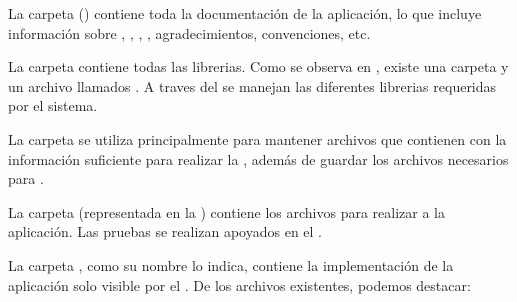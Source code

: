 

La carpeta \folderDocs () contiene toda la documentación de la aplicación, lo que incluye información sobre \deploymentCPT, \packagesAS, \routingAS, \templatesMETEOR, agradecimientos, convenciones, etc.



La carpeta \folderLib contiene todas las librerias. Como se observa en , existe una carpeta y un archivo \jsonNAME llamados \folderBower. A traves del \packagesAS \nameBower se manejan las diferentes librerias requeridas por el sistema.



La carpeta \privateFolder se utiliza principalmente para mantener archivos \jsonNAME que contienen \collectionsMETEOR con la información suficiente para realizar la \localisationPC, además de guardar los archivos necesarios para \fixturesPC.



La carpeta \folderTests (representada en la ) contiene los archivos para realizar \testingCPT a la aplicación. Las pruebas se realizan apoyados en el \packageAS \sanjoJasminePackage.



La carpeta \serverFolder, como su nombre lo indica, contiene la implementación de la aplicación solo visible por el \serverSideAS. De los archivos existentes, podemos destacar:

